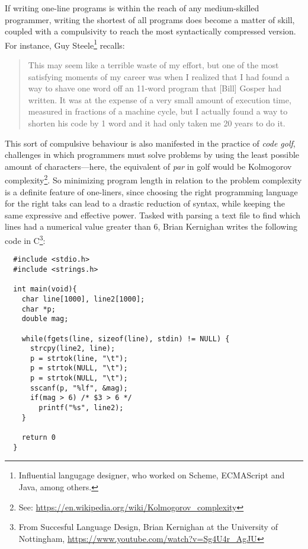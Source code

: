 If writing one-line programs is within the reach of any medium-skilled programmer, writing the shortest of all programs does become a matter of skill, coupled with a compulsivity to reach the most syntactically compressed version. For instance, Guy Steele\footnote{Influential langugage designer, who worked on Scheme, ECMAScript and Java, among others.} recalls:

\begin{quote}
  This may seem like a terrible waste of my effort, but one of the most satisfying moments of my career was when I realized that I had found a way to shave one word off an 11-word program that [Bill] Gosper had written. It was at the expense of a very small amount of execution time, measured in fractions of a machine cycle, but I actually found a way to shorten his code by 1 word and it had only taken me 20 years to do it\cite{seibel_coders_2009}.
\end{quote}

This sort of compulsive behaviour is also manifested in the practice of \emph{code golf}, challenges in which programmers must solve problems by using the least possible amount of characters—here, the equivalent of \emph{par} in golf would be Kolmogorov complexity\footnote{See: \url{https://en.wikipedia.org/wiki/Kolmogorov_complexity}}. So minimizing program length in relation to the problem complexity is a definite feature of one-liners, since choosing the right programming language for the right taks can lead to a drastic reduction of syntax, while keeping the same expressive and effective power. Tasked with parsing a text file to find which lines had a numerical value greater than 6, Brian Kernighan writes the following code in C\footnote{From Succesful Language Design, Brian Kernighan at the University of Nottingham, \url{https://www.youtube.com/watch?v=Sg4U4r_AgJU}}:

\pagebreak

\begin{lstlisting}
  #include <stdio.h>
  #include <strings.h>

  int main(void){
    char line[1000], line2[1000];
    char *p;
    double mag;

    while(fgets(line, sizeof(line), stdin) != NULL) {
      strcpy(line2, line);
      p = strtok(line, "\t");
      p = strtok(NULL, "\t");
      p = strtok(NULL, "\t");
      sscanf(p, "%lf", &mag);
      if(mag > 6) /* $3 > 6 */
        printf("%s", line2); 
    }

    return 0
  }
\end{lstlisting}

